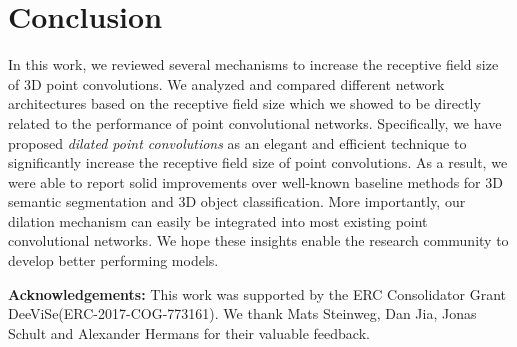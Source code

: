 \documentclass[letterpaper, 10 pt, conference]{ieeeconf}
\begin{document}
\section{Conclusion}
\label{sec:conclusion}
In this work, we reviewed several mechanisms to increase the receptive field size of 3D point convolutions. We analyzed and compared different network architectures based on the receptive field size which we showed to be directly related to the performance of point convolutional networks. 
Specifically, we have proposed \emph{dilated point convolutions} as an elegant and efficient technique to significantly increase the receptive field size of point convolutions. 
As a result, we were able to report solid improvements over well-known baseline methods for 3D semantic segmentation and 3D object classification.
More importantly, our dilation mechanism can easily be integrated into most existing point convolutional networks.
We hope these insights enable the research community to develop better performing models.

\textbf{Acknowledgements:} 
This work was supported by the ERC Consolidator Grant DeeViSe(ERC-2017-COG-773161).
We thank Mats Steinweg, Dan Jia, Jonas Schult and Alexander Hermans for their valuable feedback. 
\newpage


\balance

\end{document}
